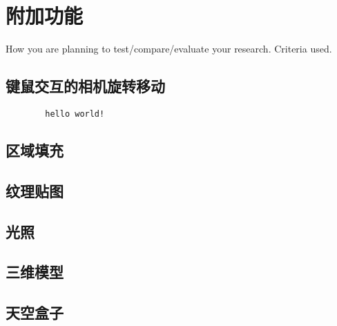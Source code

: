 

    \chapter{附加功能}

    How you are planning to test/compare/evaluate your research.
    Criteria used.
	
	\section{键鼠交互的相机旋转移动}
	\begin{lstlisting}
		hello world!
	\end{lstlisting}
	
    \section{区域填充}

    \section{纹理贴图}
    
    \section{光照}
    
    \section{三维模型}
    
    \section{天空盒子}

